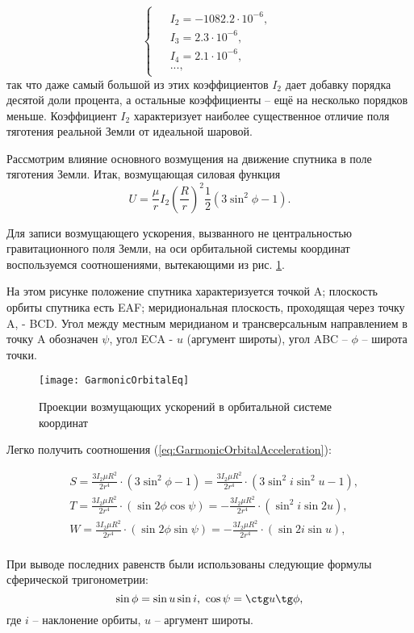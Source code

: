 \begin{equation}
  \begin{cases}
    \begin{aligned}
      & I_2 = -1082.2\cdot10^{-6}, \\
      & I_3 = 2.3\cdot10^{-6}, \\
      & I_4 = 2.1\cdot10^{-6}, \\
      & ...,
    \end{aligned}
  \end{cases}
\end{equation}
так что даже самый большой из этих коэффициентов $I_2$ дает добавку порядка
десятой доли процента, а остальные коэффициенты -- ещё на несколько порядков
меньше. Коэффициент $I_2$ характеризует наиболее существенное отличие поля
тяготения реальной Земли от идеальной шаровой.\par
Рассмотрим влияние основного возмущения на движение спутника в поле тяготения Земли.
Итак, возмущающая силовая функция
\begin{equation}
  U = \frac{\mu}{r}I_2\left(\frac{R}{r}\right)^2 \frac{1}{2}(3\sin^2\phi - 1).
\end{equation}\par
  Для записи возмущающего ускорения, вызванного не центральностью гравитационного
поля Земли, на оси орбитальной системы координат воспользуемся соотношениями,
вытекающими из рис. \ref{fig:GarmonicOrbitalEq}.\par
  На этом рисунке положение спутника характеризуется точкой A; плоскость орбиты
спутника есть EAF; меридиональная плоскость, проходящая через точку A, - BCD.
Угол между местным меридианом и трансверсальным направлением в точку A обозначен
$\psi$, угол ECA - $u$ (аргумент широты), угол ABC -- $\phi$ -- широта точки.
\begin{figure}[h]
  \centering
  \texttt{[image: GarmonicOrbitalEq]}
  \caption{Проекции возмущающих ускорений в орбитальной системе координат}
  \label{fig:GarmonicOrbitalEq}
\end{figure}\par
Легко получить соотношения (\ref{eq:GarmonicOrbitalAcceleration}):\par
\begin{equation} \label{eq:GarmonicOrbitalAcceleration}
  \begin{aligned}
    & S = \frac{3I_2\mu R^2}{2r^4} \cdot (3\sin^2\phi - 1) = \frac{3I_2\mu R^2}{2r^4} \cdot (3\sin^2 i\sin^2 u - 1), \\
    & T = \frac{3I_2\mu R^2}{2r^4} \cdot (\sin2\phi\cos\psi) = - \frac{3I_2\mu R^2}{2r^4} \cdot (\sin^2 i\sin2 u), \\
    & W = \frac{3I_2\mu R^2}{2r^4} \cdot (\sin2\phi\sin\psi) = -\frac{3I_2\mu R^2}{2r^4} \cdot (\sin2 i\sin u), \\
  \end{aligned}
\end{equation}\par
При выводе последних равенств были использованы следующие формулы сферической
тригонометрии:
\begin{equation}
  \sin\phi = \sin u \sin i,\,\, \cos\psi = \ctg u \tg\phi,
\end{equation}
где $i$ -- наклонение орбиты, $u$ -- аргумент широты.

